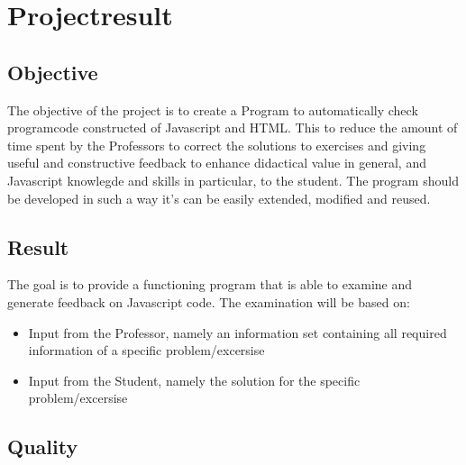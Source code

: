 \documentclass{article}
\begin{document}
\section{Projectresult}

\subsection{Objective}

The objective of the project is to create a Program to automatically check programcode constructed of Javascript and HTML. This to reduce the amount of time spent by the Professors to correct the solutions to exercises and giving useful and constructive feedback to enhance didactical value in general, and Javascript knowlegde and skills in particular, to the student. The program should be developed in such a way it's can be easily extended, modified and reused. 

\subsection{Result}

The goal is to provide a functioning program that is able to examine and generate feedback on Javascript code. The examination will be based on:

\begin{itemize}
  \item Input from the Professor, namely an information set containing all required information of a specific problem/excersise
  \item Input from the Student, namely the solution for the specific problem/excersise
\end{itemize}

\subsection{Quality}
\end{document}

